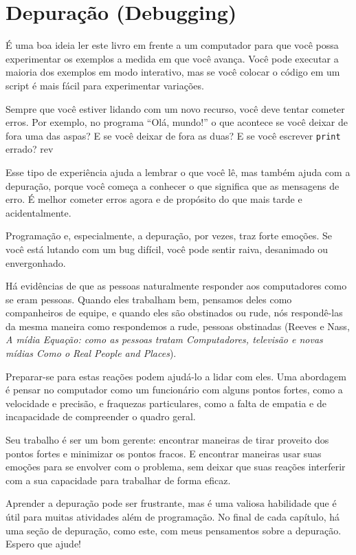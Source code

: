 \documentclass[10pt]{book}
\begin{document}
\section{Depuração (Debugging)}

É uma boa ideia ler este livro em frente a um computador para que você possa
experimentar os exemplos a medida em que você avança. Você pode executar a maioria dos exemplos em
modo interativo, mas se você colocar o código em um script é mais fácil
para experimentar variações.

Sempre que você estiver lidando com um novo recurso, você deve tentar
cometer erros. Por exemplo, no programa ``Olá, mundo!''
o que acontece se você deixar de fora uma das aspas? E
se você deixar de fora as duas? E se você escrever {\tt print} errado?
 rev%

Esse tipo de experiência ajuda a lembrar o que você lê, mas também ajuda
com a depuração, porque você começa a conhecer o que significa que as mensagens de erro.
É melhor cometer erros agora e de propósito do que mais tarde
e acidentalmente.

Programação e, especialmente, a depuração, por vezes, traz forte
emoções. Se você está lutando com um bug difícil, você pode
sentir raiva, desanimado ou envergonhado.

Há evidências de que as pessoas naturalmente responder aos computadores como se
eram pessoas. Quando eles trabalham bem, pensamos
deles como companheiros de equipe, e quando eles são obstinados ou rude, nós
respondê-las da mesma maneira como respondemos a rude,
pessoas obstinadas (Reeves e Nass, {\it A mídia
    Equação: como as pessoas tratam Computadores, televisão e novas mídias
    Como o Real People and Places}).

Preparar-se para estas reações podem ajudá-lo a lidar com eles.
Uma abordagem é pensar no computador como um funcionário com
alguns pontos fortes, como a velocidade e precisão, e
fraquezas particulares, como a falta de empatia e de incapacidade
de compreender o quadro geral.

Seu trabalho é ser um bom gerente: encontrar maneiras de tirar proveito
dos pontos fortes e minimizar os pontos fracos. E encontrar maneiras
usar suas emoções para se envolver com o problema,
sem deixar que suas reações interferir com a sua capacidade
para trabalhar de forma eficaz.

Aprender a depuração pode ser frustrante, mas é uma valiosa habilidade
que é útil para muitas atividades além de programação. No
final de cada capítulo, há uma seção de depuração, como este,
com meus pensamentos sobre a depuração. Espero que ajude!
\end{document}
